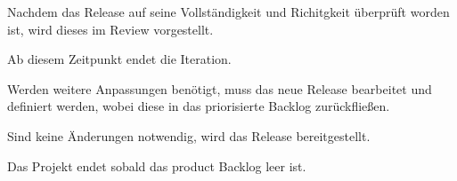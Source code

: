 Nachdem das Release auf seine Vollständigkeit und Richitgkeit überprüft worden ist, wird dieses im Review vorgestellt. 

Ab diesem Zeitpunkt endet die Iteration. 

Werden weitere Anpassungen benötigt, muss das neue Release bearbeitet und definiert werden, wobei diese in das priorisierte Backlog zurückfließen.

Sind keine Änderungen notwendig, wird das Release bereitgestellt. 

Das Projekt endet sobald das product Backlog leer ist.

















